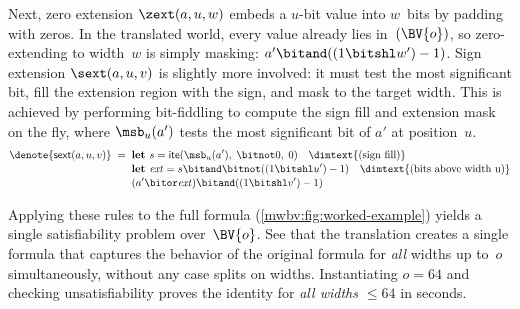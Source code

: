 Next, zero extension $\zext(a, u, w)$
embeds a $u$-bit value into $w$~bits by padding with zeros. In the
translated world, every value already lies in~$(\BV{o})$, so zero-extending to
width~$w$ is simply masking: $a' \bitand ((1 \bitshl w') - 1)$. Sign extension
$\sext(a, u, v)$ is slightly more involved: it must test the most significant
bit, fill the extension region with the sign, and mask to the target width. This
is achieved by performing bit-fiddling to compute the sign fill and extension
mask on the fly, where $\msb_u(a')$ tests the most significant bit of $a'$ at position~$u$.
%
\begin{align*}
  \denote{\mathsf{sext}(a, u, v)} \;=\;\;
  &\textbf{let } s = \mathsf{ite}(\msb_u(a'),\; \bitnot 0,\; 0)
    \quad\text{\dimtext{(sign fill)}} \\[-2pt]
  &\textbf{let } \mathit{ext} = s \bitand \bitnot((1 \bitshl u') - 1)
    \quad\text{\dimtext{(bits above width~u)}} \\[-2pt]
  &(a' \bitor \mathit{ext}) \bitand ((1 \bitshl v') - 1)
\end{align*}

Applying these rules to the full formula
(\cref{mwbv:fig:worked-example}) yields a single \qfbv{}
satisfiability problem over~$\BV{o}$.
See that the translation creates a single formula that captures the behavior of the original formula for \emph{all} widths up to~$o$ simultaneously,
without any case splits on widths.
Instantiating $o = 64$ and checking unsatisfiability proves the identity for
\emph{all widths $\leq 64$} in seconds.

